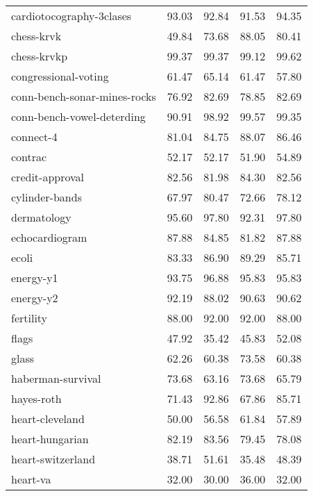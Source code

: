 \begin{longtable}{lrrrr}
      cardiotocography-3clases &   93.03 &    92.84 &  91.53 &  94.35 \\
                    chess-krvk &   49.84 &    73.68 &  88.05 &  80.41 \\
                   chess-krvkp &   99.37 &    99.37 &  99.12 &  99.62 \\
          congressional-voting &   61.47 &    65.14 &  61.47 &  57.80 \\
  conn-bench-sonar-mines-rocks &   76.92 &    82.69 &  78.85 &  82.69 \\
    conn-bench-vowel-deterding &   90.91 &    98.92 &  99.57 &  99.35 \\
                     connect-4 &   81.04 &    84.75 &  88.07 &  86.46 \\
                       contrac &   52.17 &    52.17 &  51.90 &  54.89 \\
               credit-approval &   82.56 &    81.98 &  84.30 &  82.56 \\
                cylinder-bands &   67.97 &    80.47 &  72.66 &  78.12 \\
                   dermatology &   95.60 &    97.80 &  92.31 &  97.80 \\
                echocardiogram &   87.88 &    84.85 &  81.82 &  87.88 \\
                         ecoli &   83.33 &    86.90 &  89.29 &  85.71 \\
                     energy-y1 &   93.75 &    96.88 &  95.83 &  95.83 \\
                     energy-y2 &   92.19 &    88.02 &  90.63 &  90.62 \\
                     fertility &   88.00 &    92.00 &  92.00 &  88.00 \\
                         flags &   47.92 &    35.42 &  45.83 &  52.08 \\
                         glass &   62.26 &    60.38 &  73.58 &  60.38 \\
             haberman-survival &   73.68 &    63.16 &  73.68 &  65.79 \\
                    hayes-roth &   71.43 &    92.86 &  67.86 &  85.71 \\
               heart-cleveland &   50.00 &    56.58 &  61.84 &  57.89 \\
               heart-hungarian &   82.19 &    83.56 &  79.45 &  78.08 \\
             heart-switzerland &   38.71 &    51.61 &  35.48 &  48.39 \\
                      heart-va &   32.00 &    30.00 &  36.00 &  32.00 \\

\end{longtable}
